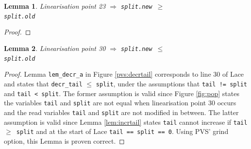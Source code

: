\documentclass{sig-alternate-br}
\newtheorem{lemma}{Lemma}
\begin{document}
\begin{lemma}
	Linearisation point 23 $\Rightarrow$ \texttt{split.new $\geq$\\ split.old}
\end{lemma}
\begin{proof}
	
\end{proof}

\begin{lemma}
	Linearisation point 30 $\Rightarrow$ \texttt{split.new $\leq$\\ split.old}
	\label{lem:lin30}
\end{lemma}
\begin{proof}
	Lemma \texttt{lem\_decr\_a} in Figure \ref{pvs:decrtail} corresponds to line 30 of Lace and states that \texttt{decr\_tail} $\leq$ \texttt{split}, under the assumptions that \texttt{tail != split} and \texttt{tail < split}.
	The former assumption is valid since Figure \ref{fig:pop} states the variables \texttt{tail} and \texttt{split} are not equal when linearisation point 30 occurs and the read variables \texttt{tail} and \texttt{split} are not modified in between.
	The latter assumption is valid since Lemma \ref{lem:incrtail} states \texttt{tail} cannot increase if \texttt{tail $\geq$ split} and at the start of Lace \texttt{tail == split == 0}.
	Using PVS' grind option, this Lemma is proven correct.
\end{proof}
\end{document}
